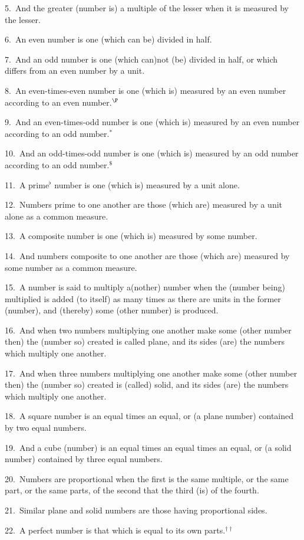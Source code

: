 \begin{Parallel}{}{}
{5.~And the greater (number is) a multiple of the lesser when it is measured by
the lesser.

6.~An even number is one (which can be) divided in half.

7.~And an odd number is one (which can)not (be) divided in half, 
or which  differs from an even number by a unit.

8.~An even-times-even number is one (which is) measured by an
even number according to an even number.$^\P$

9.~And an even-times-odd number is one (which is) measured by an
even number according to an odd number.$^\ast$

10.~And an odd-times-odd number is one (which is) measured by an
odd number according to an odd number.$^\$$

11.~A prime$^\flat$  number is one (which is) measured by a unit alone.

12.~Numbers prime to one another are those (which are) measured by a unit
alone as a common measure.

13.~A composite number is one (which is) measured by some number.

14.~And numbers composite to one another are those (which are) measured
by some number as a common measure.

15.~A number is said to multiply a(nother) number when the (number being) multiplied is added (to itself) as many times as there are units
 in the former (number), and (thereby) some (other number) is produced.
 
16.~And when two numbers multiplying one another make some
(other number then) the (number so) created  is called plane, and its sides (are) the numbers
which multiply one another.

17.~And when three numbers multiplying one another make some (other number
then) the (number so) created is (called) solid, and its sides (are) the numbers which multiply
one another.

18.~A square number is an equal times an equal, or (a plane number)
contained by two equal numbers.

19.~And a cube (number) is an equal times an equal times an equal,
or (a solid number) contained by three equal numbers.

20.~Numbers are proportional when the first is the same multiple, or
the same part, or the same parts,
of the second that the third (is) of the fourth.

21.~Similar plane and solid numbers are those having proportional
sides.

22.~A perfect number is that which is equal to its own parts.$^{\dag\dag}$}
\end{Parallel}

